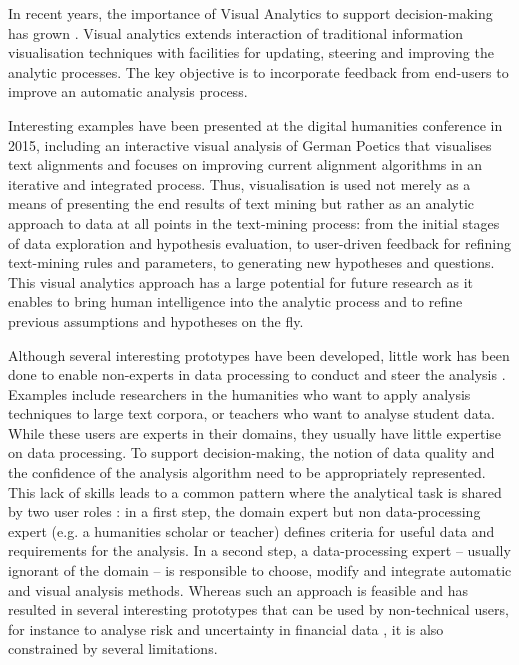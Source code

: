 \documentclass[final,5p,times,twocolumn,authoryear]{elsarticle}
\begin{document}
In recent years, the importance of Visual Analytics to support decision-making has grown \citep{keim_visual_2008}. Visual analytics extends interaction of traditional information visualisation techniques with facilities for updating, steering and improving the analytic processes. The key objective is to incorporate feedback from end-users to improve an automatic analysis process. 

Interesting examples have been presented at the digital humanities conference in 2015, including an interactive visual analysis of German Poetics \citep{john} that visualises text alignments and focuses on improving current alignment algorithms in an iterative and integrated process. Thus, visualisation is used not merely as a means of presenting the end results of text mining but rather as an analytic approach to data at all points in the text-mining process: from the initial stages of data exploration and hypothesis evaluation, to user-driven feedback for refining text-mining rules and parameters, to generating new hypotheses and questions. This  visual analytics approach has a large potential for future research as it enables to bring human intelligence into the analytic process and to refine previous assumptions and hypotheses on the fly.


Although several interesting prototypes have been developed, little work has been done to enable non-experts in data processing to conduct and steer the analysis \citep{keim2010mastering}. Examples include researchers in the humanities who want to apply analysis techniques to large text corpora, or teachers who want to analyse student data. While these users are experts in their domains, they usually have little expertise on data processing. To support decision-making,  the notion of data quality and the confidence of the analysis algorithm need to be appropriately represented.  This lack of skills leads to a common pattern where the analytical task is shared by two user roles \citep{bernard2012visual}: in a first step, the domain expert but non data-processing expert (e.g. a humanities scholar or teacher) defines criteria for useful data and requirements for the analysis. In a second step, a data-processing expert -- usually ignorant of the domain -- is responsible to choose, modify and integrate automatic and visual analysis methods. Whereas such an approach is feasible and has resulted in several interesting prototypes that can be used by non-technical users, for instance to analyse risk and uncertainty in financial data \citep{rudolph2009finvis}, it is also constrained by several limitations.
\end{document}
